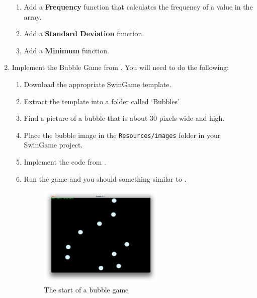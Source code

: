 \begin{enumerate}
\begin{enumerate}
      \item Add a \textbf{Frequency} function that calculates the frequency of a value in the array.
\begin{figure}[h]
\end{figure}

      \item Add a \textbf{Standard Deviation} function.
      \begin{figure}[h]
      \end{figure}

      \item Add a \textbf{Minimum} function.
      \begin{figure}[h]
      \end{figure}
  \end{enumerate}
  \clearpage
  \item Implement the Bubble Game from  . You will need to do the following:
  \begin{enumerate}
    \item Download the appropriate SwinGame template.
    \item Extract the template into a folder called `Bubbles'
    \item Find a picture of a bubble that is about 30 pixels wide and high.
    \item Place the bubble image in the \texttt{Resources/images} folder in your SwinGame project.
    \item Implement the code from .
    \item Run the game and you should something similar to .
  
  \begin{figure}[h]
     \centering
     \includegraphics[width=0.6\textwidth]{./topics/arrays/exercises/BubblesGame.png} 
     \caption{The start of a bubble game}
     \label{fig:bubble_game}
  \end{figure}
  

\end{enumerate}
\end{enumerate}
